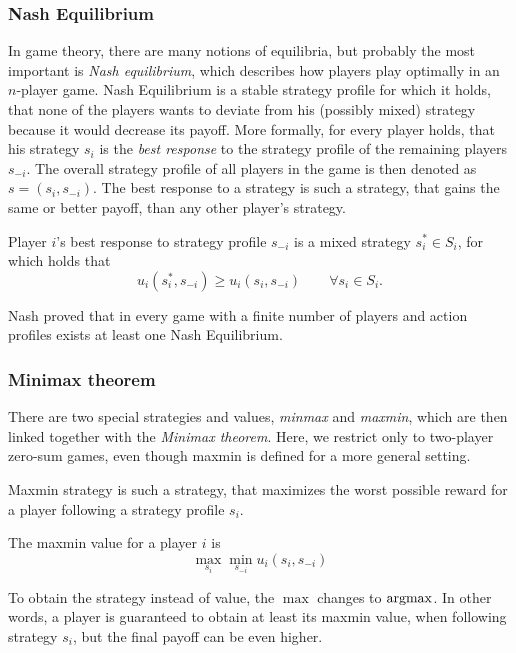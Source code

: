 \documentclass[../main.tex]{subfiles}
\begin{document}
\subsubsection{Nash Equilibrium}\label{bg:g:basics:nash}
In game theory, there are many notions of equilibria, but probably the most important is \textit{Nash equilibrium}\cite{nash}, which describes how players play optimally in an $n$-player game.
Nash Equilibrium is a stable strategy profile for which it holds, that none of the players wants to deviate from his (possibly mixed) strategy because it would decrease its payoff.
More formally, for every player holds, that his strategy $s_i$ is the \textit{best response} to the strategy profile of the remaining players $s_{-i}$.
The overall strategy profile of all players in the game is then denoted as $s = (s_i, s_{-i})$.
The best response to a strategy is such a strategy, that gains the same or better payoff, than any other player's strategy.
\begin{definition}\label{bg:g:basics:nash:bestresponse}
    Player $i$'s best response to strategy profile $s_{-i}$ is a mixed strategy $s_i^* \in S_i$, for which holds that
    \begin{equation}
        u_i(s_i^*, s_{-i}) \geq u_i(s_i, s_{-i}) \qquad \forall s_i \in S_i.
    \end{equation}
\end{definition}
Nash proved that in every game with a finite number of players and action profiles exists at least one Nash Equilibrium\cite{nash}.

\subsubsection{Minimax theorem}\label{bg:g:basics:minimax}
There are two special strategies and values, \textit{minmax} and \textit{maxmin}, which are then linked together with the \textit{Minimax theorem}\cite{minimax}.
Here, we restrict only to two-player zero-sum games, even though maxmin is defined for a more general setting.

Maxmin strategy is such a strategy, that maximizes the worst possible reward for a player following a strategy profile $s_i$.
\begin{definition}\label{bg:g:basics:minimax:maxmin}
    The maxmin value for a player $i$ is
    \[
        \max_{s_i} \min_{s_{-i}} u_i(s_i, s_{-i})
    \]
\end{definition}
To obtain the strategy instead of value, the $\max$ changes to $\operatorname*{argmax}$.
In other words, a player is guaranteed to obtain at least its maxmin value, when following strategy $s_i$, but the final payoff can be even higher.
\end{document}
